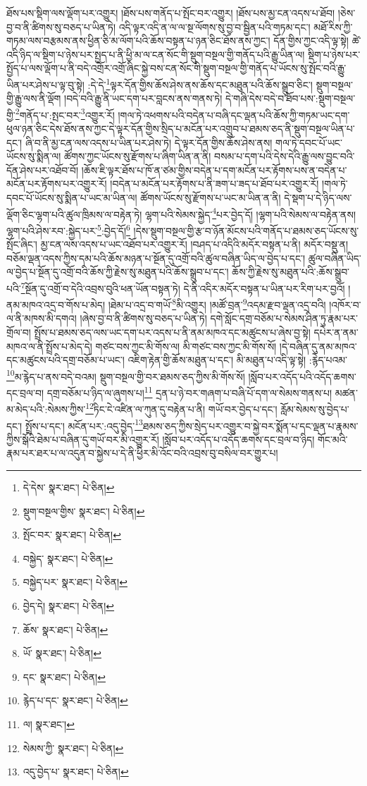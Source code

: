 ཐོས་པས་སྡིག་ལས་ལྡོག་པར་འགྱུར། །ཐོས་པས་གནོད་པ་སྤོང་བར་འགྱུར། །ཐོས་པས་མྱ་ངན་འདས་པ་ཐོབ། །ཅེས་བྱ་བ་ནི་ཚིགས་སུ་བཅད་པ་ཡིན་ཏེ། འདི་ལྟར་འདི་ན་ལ་ལ་སྔ་ལོགས་སུ་བྱ་བ་སྦྱིན་པའི་གཏམ་དང་། མཐོ་རིས་ཀྱི་གཏམ་ལས་བརྩམས་ནས་ཕྱིན་ཅི་མ་ལོག་པའི་ཆོས་བསྟན་པ་ཉན་ཅིང་ཐོས་ནས་ཀྱང་། དོན་གྱིས་ཀྱང་འདི་ལྟ་སྟེ། ཚེ་འདི་ཉིད་ལ་སྡིག་པ་ཉེས་པར་སྤྱད་པ་ནི་ཕྱི་མ་ལ་ངན་སོང་གི་སྡུག་བསྔལ་གྱི་གནོད་པའི་རྒྱུ་ཡིན་ལ། སྡིག་པ་ཉེས་པར་སྤྱོད་པ་ལས་ལྡོག་པ་ནི་བདེ་འགྲོར་འགྲོ་ཞིང་སྐྱེ་བས་ངན་སོང་གི་སྡུག་བསྔལ་གྱི་གནོད་པ་ཡོངས་སུ་སྤོང་བའི་རྒྱུ་ཡིན་པར་ཤེས་པ་ལྟ་བུ་སྟེ། :དེ་དེ་\footnote{དེ་དེས་  སྣར་ཐང་།  པེ་ཅིན། }ལྟར་དོན་གྱིས་ཆོས་ཤེས་ནས་ཆོས་དང་མཐུན་པའི་ཆོས་སྒྲུབ་ཅིང་། སྡུག་བསྔལ་གྱི་རྒྱུ་ལས་ནི་ལྡོག །བདེ་བའི་རྒྱུ་ནི་ཡང་དག་པར་བླངས་ནས་གནས་ཏེ། དེ་གཞི་དེས་བདེ་བ་ཐོབ་པས་:སྡུག་བསྔལ་གྱི་\footnote{སྡུག་བསྔལ་གྱིས་  སྣར་ཐང་།  པེ་ཅིན། }གནོད་པ་:སྤང་བར་\footnote{སྤོང་བར་  སྣར་ཐང་།  པེ་ཅིན། }འགྱུར་རོ། །གལ་ཏེ་འཕགས་པའི་བདེན་པ་བཞི་དང་ལྡན་པའི་ཆོས་ཀྱི་གཏམ་ཡང་དག་ཕུལ་ཉན་ཅིང་དེས་ཐོས་ནས་ཀྱང་དེ་ལྟར་དོན་གྱིས་སྲིད་པ་མངོན་པར་འགྲུབ་པ་ཐམས་ཅད་ནི་སྡུག་བསྔལ་ཡིན་པ་དང་། ཞི་བ་ནི་མྱ་ངན་ལས་འདས་པ་ཡིན་པར་ཤེས་ཏེ། དེ་ལྟར་དོན་གྱིས་ཆོས་ཤེས་ནས། གལ་ཏེ་དབང་པོ་ཡང་ཡོངས་སུ་སྨིན་ལ། ཚོགས་ཀྱང་ཡོངས་སུ་རྫོགས་པ་ཞིག་ཡིན་ན་ནི། བསམ་པ་དག་པའི་དེས་དེའི་རྒྱུ་ལས་བྱུང་བའི་དོན་ཤེས་པར་འཐོབ་བོ། །ཆོས་ཇི་ལྟར་ཐོས་པ་ཁོ་ན་ཙམ་གྱིས་བདེན་པ་དག་མངོན་པར་རྟོགས་པས་ན་བདེན་པ་མངོན་པར་རྟོགས་པར་འགྱུར་རོ། །བདེན་པ་མངོན་པར་རྟོགས་པ་ནི་ཟག་པ་ཟད་པ་ཐོབ་པར་འགྱུར་རོ། །གལ་ཏེ་དབང་པོ་ཡོངས་སུ་སྨིན་པ་ཡང་མ་ཡིན་ལ། ཚོགས་ཡོངས་སུ་རྫོགས་པ་ཡང་མ་ཡིན་ན་ནི། དེ་སྡག་པ་དེ་ཉིད་ལས་ལྡོག་ཅིང་ལྷག་པའི་ཚུལ་ཁྲིམས་ལ་བརྟེན་ཏེ། ལྷག་པའི་སེམས་སྐྱེད་\footnote{བསྐྱེད་  སྣར་ཐང་།  པེ་ཅིན། }པར་བྱེད་དོ། །ལྷག་པའི་སེམས་ལ་བརྟེན་ནས། ལྷག་པའི་ཤེས་རབ་:སྐྱེད་པར་\footnote{བསྐྱེད་པར་  སྣར་ཐང་།  པེ་ཅིན། }:བྱེད་དོ།\footnote{བྱེད་དེ།  སྣར་ཐང་།  པེ་ཅིན། } །དེས་སྡུག་བསྔལ་གྱི་རྩ་བ་ཉོན་མོངས་པའི་གནོད་པ་ཐམས་ཅད་ཡོངས་སུ་སྤོང་ཞིང་། མྱ་ངན་ལས་འདས་པ་ཡང་འཐོབ་པར་འགྱུར་རོ། །བཤད་པ་འདིའི་མདོར་བསྟན་པ་ནི། མདོར་བསྡུ་ན། བཅོམ་ལྡན་འདས་ཀྱིས་དམ་པའི་ཆོས་མཉན་པ་སྔོན་དུ་འགྲོ་བའི་ཚུལ་བཞིན་ཡིད་ལ་བྱེད་པ་དང་། ཚུལ་བཞིན་ཡིད་ལ་བྱེད་པ་སྔོན་དུ་འགྲོ་བའི་ཆོས་ཀྱི་རྗེས་སུ་མཐུན་པའི་ཆོས་སྒྲུབ་པ་དང་། ཆོས་ཀྱི་རྗེས་སུ་མཐུན་པའི་:ཆོས་སྒྲུབ་པའི་\footnote{ཆོས་  སྣར་ཐང་།  པེ་ཅིན། }སྔོན་དུ་འགྲོ་བ་དེའི་འབྲས་བུའི་ཕན་ཡོན་བསྟན་ཏེ། དེ་ནི་འདིར་མདོར་བསྟན་པ་ཡིན་པར་རིག་པར་བྱའོ། །ནམ་མཁའ་འདྲ་བ་གོས་པ་མེད། །ཐེམ་པ་འདྲ་བ་གཡོ་\footnote{ཡོ་  སྣར་ཐང་།  པེ་ཅིན། }མི་འགྱུར། །མཚོ་བྲན་\footnote{དང་  སྣར་ཐང་།  པེ་ཅིན། }འདམ་རྫབ་ལྡན་འདྲ་བའི། །འཁོར་བ་ལ་ནི་མཁས་མི་དགའ། །ཞེས་བྱ་བ་ནི་ཚིགས་སུ་བཅད་པ་ཡིན་ཏེ། དགེ་སློང་དགྲ་བཅོམ་པ་སེམས་ཤིན་ཏུ་རྣམ་པར་གྲོལ་བ། སྤྲོས་པ་ཐམས་ཅད་ལས་ཡང་དག་པར་འདས་པ་ནི་ནམ་མཁའ་དང་མཚུངས་པ་ཞེས་བྱ་སྟེ། དཔེར་ན་ནམ་མཁའ་ལ་ནི་སྤྲོས་པ་མེད་དེ། གཙང་བས་ཀྱང་མི་གོས་ལ། མི་གཙང་བས་ཀྱང་མི་གོས་སོ། །དེ་བཞིན་དུ་ནམ་མཁའ་དང་མཚུངས་པའི་དགྲ་བཅོམ་པ་ཡང་། འཇིག་རྟེན་གྱི་ཆོས་མཐུན་པ་དང་། མི་མཐུན་པ་འདི་ལྟ་སྟེ། :རྙེད་པའམ་\footnote{རྙེད་པ་དང་  སྣར་ཐང་།  པེ་ཅིན། }མ་རྙེད་པ་ནས་བདེ་བའམ། སྡུག་བསྔལ་གྱི་བར་ཐམས་ཅད་ཀྱིས་མི་གོས་སོ། །སློབ་པར་འདོད་པའི་འདོད་ཆགས་དང་བྲལ་བ། དགྲ་བཅོམ་པ་ཉིད་ལ་ཞུགས་པ།\footnote{ལ།  སྣར་ཐང་། } དྲན་པ་ཉེ་བར་གཞག་པ་བཞི་པོ་དག་ལ་སེམས་གནས་པ། མཚན་མ་མེད་པའི་:སེམས་ཀྱིས་\footnote{སེམས་ཀྱི་  སྣར་ཐང་།  པེ་ཅིན། }ཏིང་ངེ་འཛིན་ལ་ཀུན་དུ་བརྟེན་པ་ནི། གཡོ་བར་བྱེད་པ་དང་། རློམ་སེམས་སུ་བྱེད་པ་དང་། སྤྲོས་པ་དང་། མངོན་པར་:འདུ་བྱེད་\footnote{འདུ་བྱེད་པ་  སྣར་ཐང་།  པེ་ཅིན། }ཐམས་ཅད་ཀྱིས་སྲེད་པར་འགྱུར་བ་སྐྱེ་བར་སྨོན་པ་དང་ལྡན་པ་རྣམས་ཀྱིས་སྒོའི་ཐེམ་པ་བཞིན་དུ་གཡོ་བར་མི་འགྱུར་རོ། །སློབ་པར་འདོད་པ་འདོད་ཆགས་དང་བྲལ་བ་ཉིད། གོང་མའི་རྣམ་པར་ཐར་པ་ལ་འདུན་བ་སྐྱེས་པ་དེ་ནི་ཕྱིར་མི་འོང་བའི་འབྲས་བུ་བསིལ་བར་གྱུར་པ། 